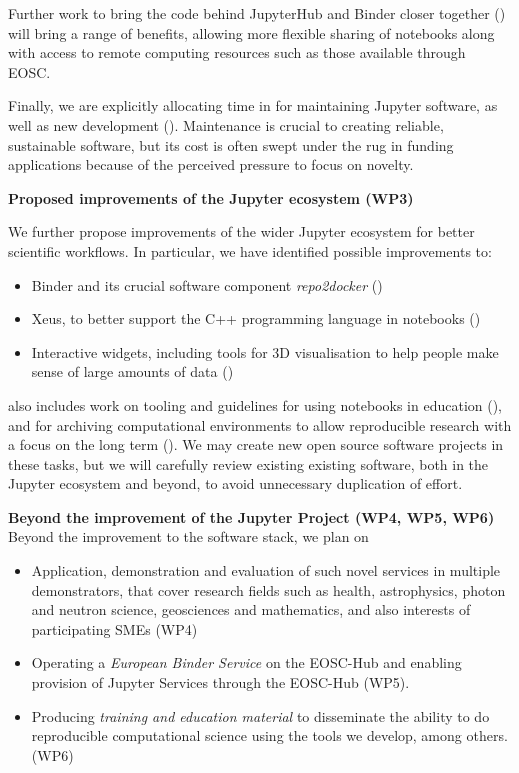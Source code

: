 Further work to bring the code behind JupyterHub and Binder closer together
() will bring a range of benefits, allowing more
flexible sharing of notebooks along with access to remote computing resources
such as those available through EOSC.

Finally, we are explicitly allocating time in  for maintaining
Jupyter software, as well as new development ().
Maintenance is crucial to creating reliable, sustainable software,
but its cost is often swept under the rug in funding applications
because of the perceived pressure to focus on novelty.

\textbf{Proposed improvements of the Jupyter ecosystem (WP3)}

We further propose improvements of the wider Jupyter ecosystem for
better scientific workflows. In particular, we have identified
possible improvements to:

\begin{itemize}
  \item Binder and its crucial software component \emph{repo2docker}
    ()

  \item Xeus, to better support the C++ programming language in notebooks
    ()

  \item Interactive widgets, including tools for 3D visualisation to help
    people make sense of large amounts of data ()
\end{itemize}

 also includes work on tooling and guidelines for using
notebooks in education (),
and for archiving computational environments to allow reproducible research
with a focus on the long term ().
We may create new open source software projects in these tasks,
but we will carefully review existing existing software, both in the
Jupyter ecosystem and beyond, to avoid unnecessary duplication of effort.

\textbf{Beyond the improvement of the Jupyter Project (WP4,
  WP5, WP6)}
Beyond the improvement to the software stack, we plan on
\begin{itemize}
\item Application, demonstration and evaluation of such novel services
  in multiple demonstrators, that cover research fields such as
  health, astrophysics, photon and neutron science, geosciences and
  mathematics, and also interests of participating SMEs (WP4)
\item Operating a \emph{European Binder Service} on the EOSC-Hub and
  enabling provision of Jupyter Services through the EOSC-Hub (WP5).
\item Producing \emph{training and education material} to disseminate
  the ability to do reproducible computational science using the tools
  we develop, among others. (WP6)
\end{itemize}

